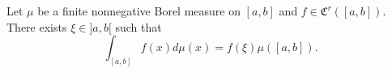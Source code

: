 Let $\mu$ be a finite nonnegative Borel measure on $[a,b]$ and $f \in \mathfrak{C}^r([a,b])$. There exists $\xi \in ]a,b[$ such that
$$\int_{[a,b]} f(x) d\mu(x) = f(\xi) \mu([a,b]).$$

